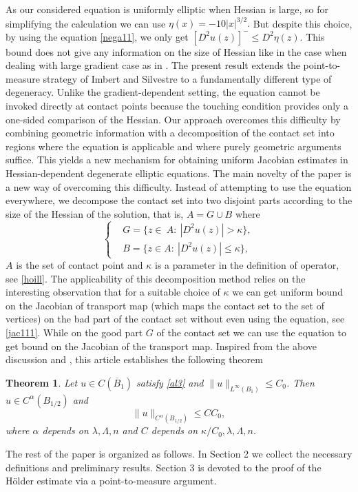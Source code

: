 \documentclass{amsart}
\newtheorem{theorem}{Theorem}[section]
\theoremstyle{plain}
\numberwithin{equation}{section}
\begin{document}
As our considered equation is uniformly elliptic when Hessian is large, so for simplifying the calculation we can use $\eta(x)=-10|x|^{3/2}.$ But despite this choice, by using the equation \eqref{nega11}, we only get $[D^{2}u(z)]^{-}\leq D^{2}\eta(z).$ This bound does not give any information on the size of Hessian like in the case when dealing with large gradient case as in \cite{imbert2016estimates}. The present result extends the point-to-measure strategy of Imbert and Silvestre \cite{imbert2016estimates} to a fundamentally different
type of degeneracy. Unlike the gradient-dependent setting, the equation cannot be invoked directly at contact points because the touching condition provides only a one-sided comparison of the Hessian. Our approach overcomes this difficulty by combining geometric information with a decomposition of the
contact set into regions where the equation is applicable and where purely geometric arguments suffice. This yields a new mechanism for obtaining uniform
Jacobian estimates in Hessian-dependent degenerate elliptic equations. The main novelty of the paper is a new way of overcoming this difficulty. Instead of attempting to use the equation everywhere, we decompose the contact set into two disjoint parts according to the size of the Hessian of the
solution, that is, $A=G\cup B$ where
\begin{equation*}
\left\{
\begin{aligned}
&G=\{z\in~A:\ |D^{2}u(z)|>\kappa\},\\
&B=\{z\in A:\ |D^{2}u(z)|\le\kappa\},
\end{aligned}
\right.
\end{equation*}
$A$ is the set of contact point and $\kappa$ is a parameter in the definition of operator, see \eqref{hoill}. The applicability of this decomposition method relies on the interesting observation that for a suitable choice of $\kappa$ we can get uniform bound on the Jacobian of transport map (which maps the contact set to the set of vertices) on the bad part of the contact set without even using the equation, see \eqref{jac111}. While on the good part $G$ of the contact set we can use the equation to get bound on the Jacobian of the transport map. Inspired from the above discussion and \cite{imbert2016estimates}, this article establishes the following theorem
\begin{theorem}\label{mainthm}
Let $u\in C(\overline{B}_{1})$ satisfy \eqref{al3} and $\|u\|_{L^{\infty}(B_{1})}\leq C_{0}$. Then $u\in C^{\alpha}(B_{1/2})$ and
\[
\|u\|_{C^{\alpha}(B_{1/2})}\leq C C_{0},
\]
where $\alpha$ depends on $\lambda,\Lambda,n$ and $C$ depends on $\kappa/C_{0},\lambda,\Lambda,n$.
\end{theorem}
The rest of the paper is organized as follows. In Section 2 we collect the necessary definitions and preliminary results. Section 3 is devoted to the proof of the H\"{o}lder estimate via a point-to-measure argument. 
\end{document}
